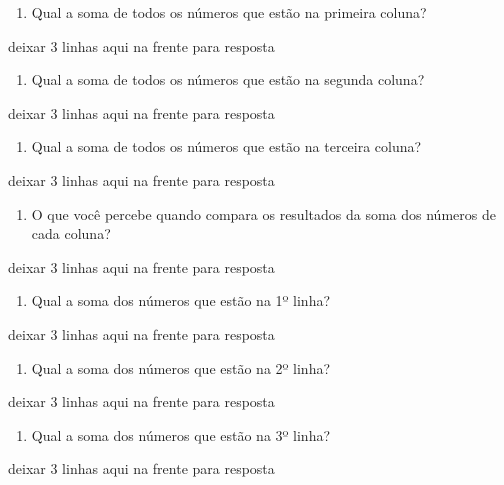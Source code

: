 \begin{enumerate}
\def\labelenumi{\alph{enumi})}
\item
  Qual a soma de todos os números que estão na primeira coluna?
\end{enumerate}

deixar 3 linhas aqui na frente para resposta

\begin{enumerate}
\def\labelenumi{\alph{enumi})}
\item
  Qual a soma de todos os números que estão na segunda coluna?
\end{enumerate}

deixar 3 linhas aqui na frente para resposta

\begin{enumerate}
\def\labelenumi{\alph{enumi})}
\item
  Qual a soma de todos os números que estão na terceira coluna?
\end{enumerate}

deixar 3 linhas aqui na frente para resposta

\begin{enumerate}
\def\labelenumi{\alph{enumi})}
\item
  O que você percebe quando compara os resultados da soma dos números de
  cada coluna?
\end{enumerate}

deixar 3 linhas aqui na frente para resposta

\begin{enumerate}
\def\labelenumi{\alph{enumi})}
\item
  Qual a soma dos números que estão na 1º linha?
\end{enumerate}

deixar 3 linhas aqui na frente para resposta

\begin{enumerate}
\def\labelenumi{\alph{enumi})}
\item
  Qual a soma dos números que estão na 2º linha?
\end{enumerate}

deixar 3 linhas aqui na frente para resposta

\begin{enumerate}
\def\labelenumi{\alph{enumi})}
\item
  Qual a soma dos números que estão na 3º linha?
\end{enumerate}

deixar 3 linhas aqui na frente para resposta


